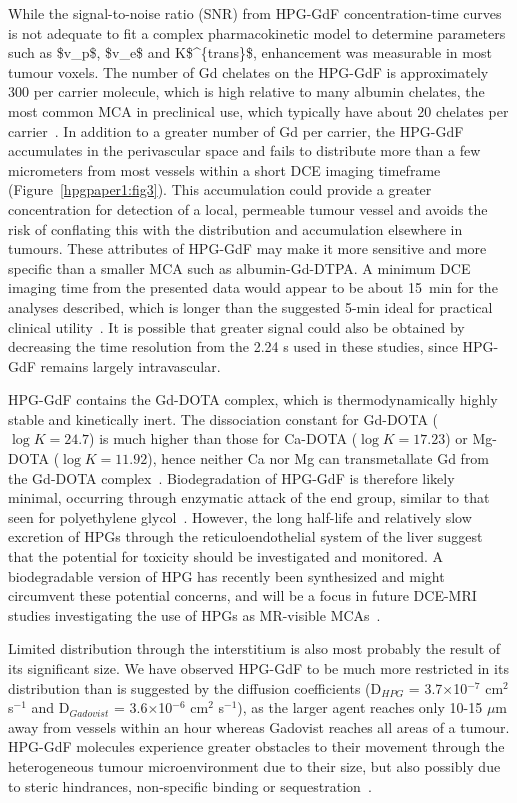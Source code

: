 While the signal-to-noise ratio (\acs{SNR}) from \acs{HPG-GdF} concentration-time curves is not adequate to fit a complex pharmacokinetic model to determine parameters such as \acs{$v_p$}, \acs{$v_e$} and \acs{K$^{trans}$}, enhancement was measurable in most tumour voxels.
The number of Gd chelates on the \acs{HPG-GdF} is approximately 300 per carrier molecule, which is high relative to many albumin chelates, the most common \acs{MCA} in preclinical use, which typically have about 20 chelates per carrier~\cite{Ogan:1987tg}.
In addition to a greater number of Gd per carrier, the \acs{HPG-GdF} accumulates in the perivascular space and fails to distribute more than a few micrometers from most vessels within a short DCE imaging timeframe (Figure~\ref{hpgpaper1:fig3}).
This accumulation could provide a greater concentration for detection of a local, permeable tumour vessel and avoids the risk of conflating this with the distribution and accumulation elsewhere in tumours.
These attributes of \acs{HPG-GdF} may make it more sensitive and more specific than a smaller \acs{MCA} such as albumin-Gd-DTPA.
A minimum DCE imaging time from the presented data would appear to be about 15~min for the analyses described, which is longer than the suggested 5-min ideal for practical clinical utility~\cite{Turetschek:2004bw}.
It is possible that greater signal could also be obtained by decreasing the time resolution from the 2.24 s used in these studies, since \acs{HPG-GdF} remains largely intravascular.

\acs{HPG-GdF} contains the Gd-\acs{DOTA} complex, which is thermodynamically highly stable and kinetically inert.
The dissociation constant for Gd-\acs{DOTA} ($\log K = 24.7$) is much higher than those for Ca-\acs{DOTA} ($\log K = 17.23$) or Mg-\acs{DOTA} ($\log K = 11.92$), hence neither Ca nor Mg can transmetallate Gd from the Gd-\acs{DOTA} complex~\cite{Baranyai:2005ta}.
Biodegradation of \acs{HPG-GdF} is therefore likely minimal, occurring through enzymatic attack of the end group, similar to that seen for polyethylene glycol~\cite{Kawai:2002fc}.
However, the long half-life and relatively slow excretion of HPGs through the reticuloendothelial system of the liver suggest that the potential for toxicity should be investigated and monitored.
A biodegradable version of HPG has recently been synthesized and might circumvent these potential concerns, and will be a focus in future \acs{DCE-MRI} studies investigating the use of HPGs as MR-visible \acs{MCA}s~\cite{Shenoi:2013id}.

Limited distribution through the interstitium is also most probably the result of its significant size.
We have observed \acs{HPG-GdF} to be much more restricted in its distribution than is suggested by the diffusion coefficients (D$_{HPG}$ = 3.7$\times$10$^{-7}$ cm$^2$ s$^{-1}$ and D$_{Gadovist}$ = 3.6$\times$10$^{-6}$ cm$^2$ s$^{-1}$), as the larger agent reaches only 10-15 $\mu$m away from vessels within an hour whereas Gadovist reaches all areas of a tumour.
\acs{HPG-GdF} molecules experience greater obstacles to their movement through the heterogeneous tumour microenvironment due to their size, but also possibly due to steric hindrances, non-specific binding or sequestration~\cite{Minchinton:2006gs}.

